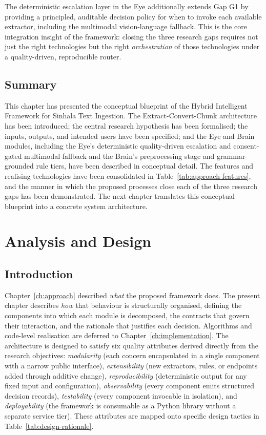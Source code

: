 \documentclass[12pt,a4paper,oneside]{report}
\begin{document}
The deterministic escalation layer in the Eye additionally extends Gap G1 by providing a principled, auditable decision policy for when to invoke each available extractor, including the multimodal vision-language fallback. This is the core integration insight of the framework: closing the three research gaps requires not just the right technologies but the right \textit{orchestration} of those technologies under a quality-driven, reproducible router.

\section{Summary}
\label{sec:ch4-summary}
This chapter has presented the conceptual blueprint of the Hybrid Intelligent Framework for Sinhala Text Ingestion. The Extract-Convert-Chunk architecture has been introduced; the central research hypothesis has been formalised; the inputs, outputs, and intended users have been specified; and the Eye and Brain modules, including the Eye's deterministic quality-driven escalation and consent-gated multimodal fallback and the Brain's preprocessing stage and grammar-grounded rule tiers, have been described in conceptual detail. The features and realising technologies have been consolidated in Table~\ref{tab:approach-features}, and the manner in which the proposed processes close each of the three research gaps has been demonstrated. The next chapter translates this conceptual blueprint into a concrete system architecture.

\chapter{Analysis and Design}
\label{ch:design}

\section{Introduction}
Chapter~\ref{ch:approach} described \textit{what} the proposed framework does. The present chapter describes \textit{how} that behaviour is structurally organised, defining the components into which each module is decomposed, the contracts that govern their interaction, and the rationale that justifies each decision. Algorithms and code-level realisation are deferred to Chapter~\ref{ch:implementation}. The architecture is designed to satisfy six quality attributes derived directly from the research objectives: \textit{modularity} (each concern encapsulated in a single component with a narrow public interface), \textit{extensibility} (new extractors, rules, or endpoints added through additive change), \textit{reproducibility} (deterministic output for any fixed input and configuration), \textit{observability} (every component emits structured decision records), \textit{testability} (every component invocable in isolation), and \textit{deployability} (the framework is consumable as a Python library without a separate service tier). These attributes are mapped onto specific design tactics in Table~\ref{tab:design-rationale}.
\end{document}
